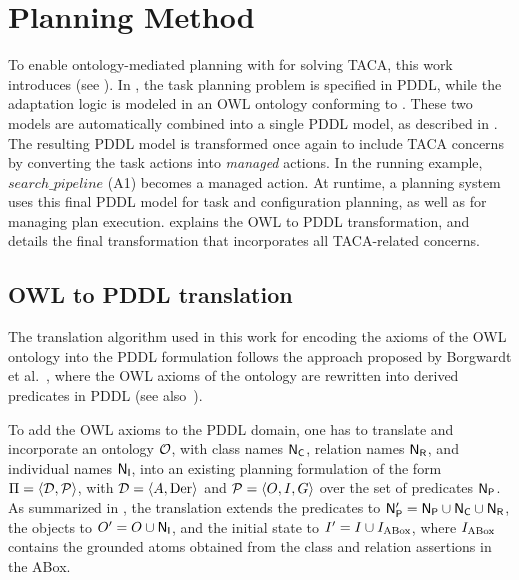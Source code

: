 \section{Planning Method}\label{planta:sec:method}

To enable ontology-mediated planning with \pddltomasys for solving TACA, this work introduces \planta (see ). In \planta, the task planning problem is specified in PDDL, while the adaptation logic is modeled in an OWL ontology conforming to \pddltomasys. These two models are automatically combined into a single PDDL model, as described in . The resulting PDDL model is transformed once again to include TACA concerns by converting the task actions into \textit{managed} actions. In the running example, $search\_pipeline$ (A1) becomes a managed action. At runtime, a planning system uses this final PDDL model for task and configuration planning, as well as for managing plan execution.
 explains the OWL to PDDL transformation, and  details the final transformation that incorporates all TACA-related concerns.

\subsection{OWL to PDDL translation}\label{planta:sec:owl_to_pddl}

The translation algorithm used in this work for encoding the axioms of the OWL ontology into the PDDL formulation follows the approach proposed by Borgwardt et al.~\cite{DBLP:conf/aaai/Borgwardt0KKNS22}, where the OWL axioms of the ontology are rewritten into derived predicates in PDDL (see also~).

To add the OWL axioms to the PDDL domain, one has to translate and incorporate an ontology $\mathcal{O}$, with class names $\mathsf{N}_\mathsf{C}$, relation names $\mathsf{N_R}$, and individual names $\mathsf{N_I}$, into an existing planning formulation of the form $\Pi = \langle \mathcal{D}, \mathcal{P} \rangle$, with $\mathcal{D} = \langle A, \text{Der} \rangle$ and $\mathcal{P}= \langle O, I, G \rangle$ over the set of predicates $\mathsf{N}_\mathsf{P}$. As summarized in , the translation extends the predicates to $\mathsf{N}_\mathsf{P}' = \mathsf{N}_\mathsf{P} \cup \mathsf{N}_\mathsf{C} \cup \mathsf{N_R}$, the objects to $O' = O \cup \mathsf{N_I}$, and the initial state to $I' = I \cup I_{\text{ABox}}$, where $I_{\text{ABox}}$ contains the grounded atoms obtained from the class and relation assertions in the ABox.

